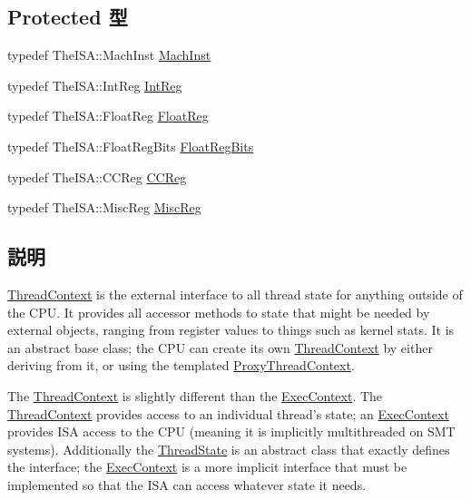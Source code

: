 \subsection*{Protected 型}
\begin{DoxyCompactItemize}
\item 
typedef TheISA::MachInst \hyperlink{classThreadContext_a4617f528417b8f55f809ae0988284c9b}{MachInst}
\item 
typedef TheISA::IntReg \hyperlink{classThreadContext_a1355cb78d031430d4d70eb5080267604}{IntReg}
\item 
typedef TheISA::FloatReg \hyperlink{classThreadContext_a75484259f1855aabc8d74c6eb1cfe186}{FloatReg}
\item 
typedef TheISA::FloatRegBits \hyperlink{classThreadContext_aab5eeae86499f9bfe15ef79360eccc64}{FloatRegBits}
\item 
typedef TheISA::CCReg \hyperlink{classThreadContext_a0c9de550a32808e6a25b54b6c791d5ab}{CCReg}
\item 
typedef TheISA::MiscReg \hyperlink{classThreadContext_aaf5f073a387db0556d1db4bcc45428bc}{MiscReg}
\end{DoxyCompactItemize}


\subsection{説明}
\hyperlink{classThreadContext}{ThreadContext} is the external interface to all thread state for anything outside of the CPU. It provides all accessor methods to state that might be needed by external objects, ranging from register values to things such as kernel stats. It is an abstract base class; the CPU can create its own \hyperlink{classThreadContext}{ThreadContext} by either deriving from it, or using the templated \hyperlink{classProxyThreadContext}{ProxyThreadContext}.

The \hyperlink{classThreadContext}{ThreadContext} is slightly different than the \hyperlink{classExecContext}{ExecContext}. The \hyperlink{classThreadContext}{ThreadContext} provides access to an individual thread's state; an \hyperlink{classExecContext}{ExecContext} provides ISA access to the CPU (meaning it is implicitly multithreaded on SMT systems). Additionally the \hyperlink{structThreadState}{ThreadState} is an abstract class that exactly defines the interface; the \hyperlink{classExecContext}{ExecContext} is a more implicit interface that must be implemented so that the ISA can access whatever state it needs. 

